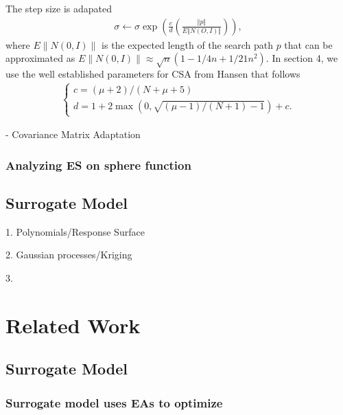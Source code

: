 The step size is adapated 
\begin{align}
\sigma \leftarrow \sigma \exp \left (  \frac{c}{d}  \left( \frac{\Vert p\Vert}{E \Vert N(O,I)\Vert } \right) \right ),
\end{align}
where $E\| N(0,I) \|$ is the expected length of the search path $p$ that can be approximated as $E\| N(0,I) \| \approx \sqrt{n} (1-1/4n + 1/21n^2)$. In section 4, we use the well established parameters for CSA from  Hansen \cite{hansen2016cma} that follows 
\begin{align}
\begin{cases}
c = (\mu+2)/(N+\mu+5)\\
d=1+2 \max\left (0, \sqrt{(\mu-1)/(N+1)-1} \right)+c.
\end{cases}
\end{align}


- Covariance Matrix Adaptation 



\subsubsection{Analyzing ES on sphere function}






\subsection{Surrogate Model} 

1. Polynomials/Response Surface 

2. Gaussian processes/Kriging

3. 






\section{Related Work}

\subsection{Surrogate Model} 

\subsubsection{Surrogate model uses EAs to optimize}


